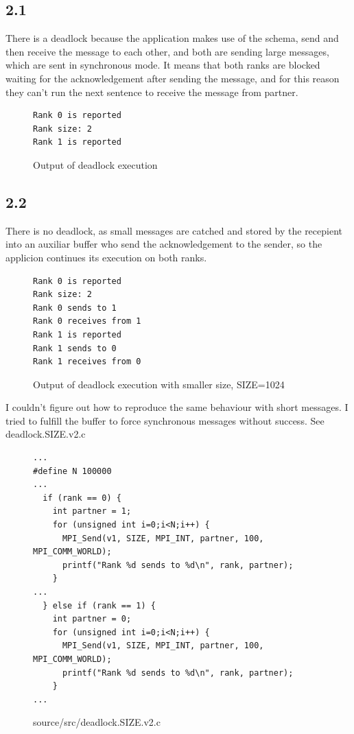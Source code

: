 \documentclass[12pt]{article}
\begin{document}
\subsection*{2.1}

There is a deadlock because the application makes use of the schema, send and then receive the message to each other, and both are sending large messages, which are sent in synchronous mode. It means that both ranks are blocked waiting for the acknowledgement after sending the message, and for this reason they can't run the next sentence to receive the message from partner.

\begin{figure}[h!]
	\begin{verbatim}
Rank 0 is reported
Rank size: 2
Rank 1 is reported
	\end{verbatim}
\caption{Output of deadlock execution}\label{code:build}
\end{figure}

\subsection*{2.2}

There is no deadlock, as small messages are catched and stored by the recepient into an auxiliar buffer who send the acknowledgement to the sender, so the applicion continues its execution on both ranks.

\begin{figure}[h!]
	\begin{verbatim}
Rank 0 is reported
Rank size: 2
Rank 0 sends to 1
Rank 0 receives from 1
Rank 1 is reported
Rank 1 sends to 0
Rank 1 receives from 0
	\end{verbatim}
	\caption{Output of deadlock execution with smaller size, SIZE=1024}\label{code:build}
\end{figure}

I couldn't figure out how to reproduce the same behaviour with short messages. I tried to fulfill the buffer to force synchronous messages without success. See deadlock.SIZE.v2.c

\begin{figure}[h!]
	\begin{verbatim}
...
#define N 100000
...
  if (rank == 0) {
    int partner = 1;
    for (unsigned int i=0;i<N;i++) {
      MPI_Send(v1, SIZE, MPI_INT, partner, 100, MPI_COMM_WORLD);
      printf("Rank %d sends to %d\n", rank, partner);
    }
...
  } else if (rank == 1) {
    int partner = 0;
    for (unsigned int i=0;i<N;i++) {
      MPI_Send(v1, SIZE, MPI_INT, partner, 100, MPI_COMM_WORLD);
      printf("Rank %d sends to %d\n", rank, partner);
    }
...
	\end{verbatim}
	\caption{source/src/deadlock.SIZE.v2.c}\label{code:size2}
\end{figure}
\end{document}
